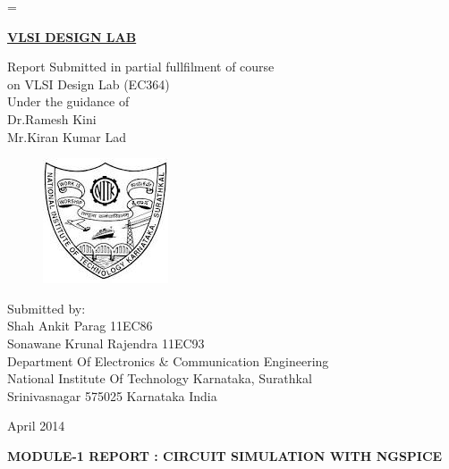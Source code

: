 \documentclass[12pt,a4paper]{article}
\begin{document}
 
\parskip = \baselineskip 
\begin{center}
{\underline{\LARGE{\bf
{VLSI DESIGN LAB}
}}}
\bigskip
\bigskip
\bigskip
\\
{\Large{Report Submitted in partial fullfilment of course\\ on VLSI Design Lab (EC364)}
\\
\bigskip
\bigskip
\bigskip
Under the guidance of\\
Dr.Ramesh Kini\\
Mr.Kiran Kumar Lad

\bigskip
\bigskip

\begin{figure}[!h]
\centering
\includegraphics[scale=1.0]{images-1.jpeg}
\end{figure}

\bigskip
\vspace{10pt}
Submitted by:\\
Shah Ankit Parag 11EC86 \\ Sonawane Krunal Rajendra 11EC93
\\
\vspace{118pt}
Department Of Electronics \& Communication Engineering 
    \\National Institute Of Technology Karnataka, Surathkal 
      \\Srinivasnagar 575025 Karnataka India 

\vspace{5pt}
April 2014 }
\end{center}
\clearpage
\tableofcontents

\clearpage
\centerline{\bf
{MODULE-1 REPORT : CIRCUIT SIMULATION WITH NGSPICE}}

\bigskip
\end{document}
